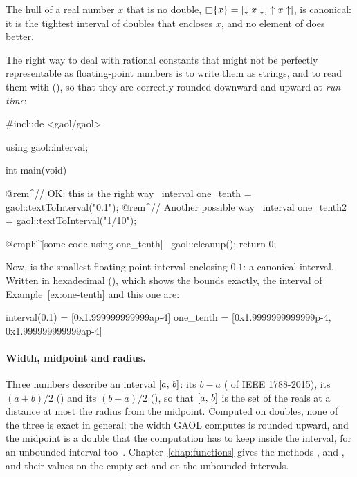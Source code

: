 \documentclass[12pt,a4paper,twoside,openright]{book}
\begin{document}
The hull of a real number $x$ that is no double,
$\mathop{\Box} \{x\}=[\downarrow x\downarrow,\,\uparrow x\uparrow]$, is canonical: it is the
tightest interval of doubles that encloses $x$, and no element of \ISet{}
does better.

\begin{Ex}\label{ex:one-tenth-right}
The right way to deal with rational constants that might not be perfectly
representable as floating-point numbers is to write them as strings, and to
read them with  (), so
that they are correctly rounded downward and upward at \emph{run time}:
\begin{example}
#include <gaol/gaol>

using gaol::interval;

int main(void)
{
  @rem^// OK: this is the right way~
  interval one_tenth = gaol::textToInterval("0.1");
  @rem^// Another possible way~
  interval one_tenth2 = gaol::textToInterval("1/10");

  @emph^[some code using one_tenth]~
  gaol::cleanup();
  return 0;
}
\end{example}
Now,  is the smallest floating-point interval enclosing
$0.1$: a canonical interval. Written in hexadecimal
(), which shows the bounds exactly, the interval of
Example~\ref{ex:one-tenth} and this one are:
\begin{onscreen}
interval(0.1) = [0x1.999999999999ap-4]
one_tenth     = [0x1.9999999999999p-4, 0x1.999999999999ap-4]
\end{onscreen}
\end{Ex}

\paragraph{Width, midpoint and radius.}
Three numbers describe an interval $[a,\,b]$: its  $b-a$
( of IEEE 1788-2015), its  $(a+b)/2$ ()
and its  $(b-a)/2$ (), so that $[a,\,b]$ is the
set of the reals at a distance at most the radius from the midpoint.
Computed on doubles, none of the three is exact in general: the width GAOL
computes is rounded upward, and the midpoint is a double that the
computation has to keep inside the interval, for an unbounded interval
too~\cite{Goualard:TOMS2014}. Chapter~\ref{chap:functions} gives the
methods ,  and , and their
values on the empty set and on the unbounded intervals.
%
\end{document}
